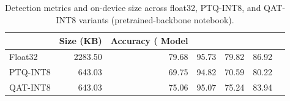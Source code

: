 \begin{table}
\caption{Detection metrics and on-device size across float32, PTQ-INT8, and QAT-INT8 variants (pretrained-backbone notebook).}
\label{tab:qat_comparison_pretrained}
\begin{tabular}{lrrrrr}
\toprule
 & Size (KB) & Accuracy (%
Model &  &  &  &  &  \\
\midrule
Float32 & 2283.50 & 79.68 & 95.73 & 79.82 & 86.92 \\
PTQ-INT8 & 643.03 & 69.75 & 94.82 & 70.59 & 80.22 \\
QAT-INT8 & 643.03 & 75.06 & 95.07 & 75.24 & 83.94 \\
\bottomrule
\end{tabular}
\end{table}
